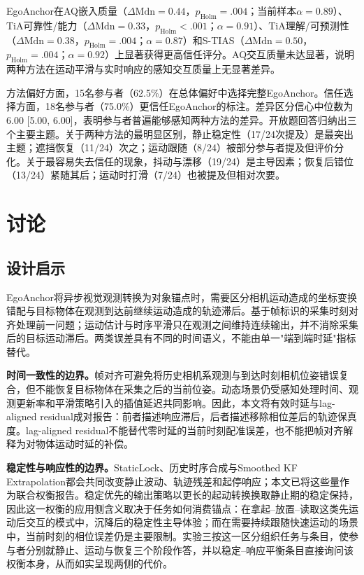 \documentclass[review]{vgtc}
\begin{document}
EgoAnchor在AQ嵌入质量（$\Delta\mathrm{Mdn}=0.44$，$p_{\mathrm{Holm}}=.004$；当前样本$\alpha=0.89$）、TiA可靠性/能力（$\Delta\mathrm{Mdn}=0.33$，$p_{\mathrm{Holm}}<.001$；$\alpha=0.91$）、TiA理解/可预测性（$\Delta\mathrm{Mdn}=0.38$，$p_{\mathrm{Holm}}=.004$；$\alpha=0.87$）和S-TIAS（$\Delta\mathrm{Mdn}=0.50$，$p_{\mathrm{Holm}}=.004$；$\alpha=0.92$）上显著获得更高信任评分。AQ交互质量未达显著，说明两种方法在运动平滑与实时响应的感知交互质量上无显著差异。

方法偏好方面，15名参与者（62.5\%）在总体偏好中选择完整EgoAnchor。信任选择方面，18名参与者（75.0\%）更信任EgoAnchor的标注。差异区分信心中位数为6.00 [5.00, 6.00]，表明参与者普遍能够感知两种方法的差异。开放题回答归纳出三个主要主题。关于两种方法的最明显区别，静止稳定性（17/24次提及）是最突出主题；遮挡恢复（11/24）次之；运动跟随（8/24）被部分参与者提及但评价分化。关于最容易失去信任的现象，抖动与漂移（19/24）是主导因素；恢复后错位（13/24）紧随其后；运动时打滑（7/24）也被提及但相对次要。

\section{讨论}\label{sec:discussion}

\subsection{设计启示}

EgoAnchor将异步视觉观测转换为对象锚点时，需要区分相机运动造成的坐标变换错配与目标物体在观测到达前继续运动造成的轨迹滞后。基于帧标识的采集时刻对齐处理前一问题；运动估计与时序平滑只在观测之间维持连续输出，并不消除采集后的目标运动滞后。两类误差具有不同的时间语义，不能由单一"端到端时延"指标替代。

\textbf{时间一致性的边界。}帧对齐可避免将历史相机系观测与到达时刻相机位姿错误复合，但不能恢复目标物体在采集之后的当前位姿。动态场景仍受感知处理时间、观测更新率和平滑策略引入的插值延迟共同影响。因此，本文将有效时延与lag-aligned residual成对报告：前者描述响应滞后，后者描述移除相位差后的轨迹保真度。lag-aligned residual不能替代零时延的当前时刻配准误差，也不能把帧对齐解释为对物体运动时延的补偿。

\textbf{稳定性与响应性的边界。}StaticLock、历史时序合成与Smoothed KF Extrapolation都会共同改变静止波动、轨迹残差和起停响应；本文已将这些量作为联合权衡报告。稳定优先的输出策略以更长的起动转换换取静止期的稳定保持，因此这一权衡的应用侧含义取决于任务如何消费锚点：在拿起--放置--读取这类先运动后交互的模式中，沉降后的稳定性主导体验；而在需要持续跟随快速运动的场景中，当前时刻的相位误差仍是主要限制。实验三按这一区分组织任务与条目，使参与者分别就静止、运动与恢复三个阶段作答，并以稳定--响应平衡条目直接询问该权衡本身，从而如实呈现两侧的代价。
\end{document}
